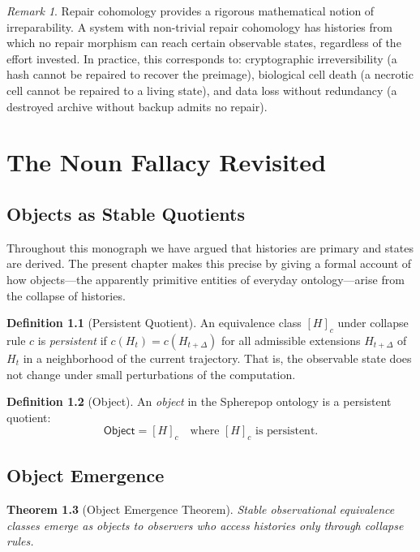 \documentclass[12pt, a4paper, openany]{book}
\theoremstyle{plain}
\newtheorem{theorem}{Theorem}[chapter]
\theoremstyle{definition}
\newtheorem{definition}[theorem]{Definition}
\theoremstyle{remark}
\newtheorem{remark}[theorem]{Remark}
\begin{document}
\begin{remark}
Repair cohomology provides a rigorous mathematical notion of irreparability.
A system with non-trivial repair cohomology has histories from which no
repair morphism can reach certain observable states, regardless of the effort
invested. In practice, this corresponds to: cryptographic irreversibility
(a hash cannot be repaired to recover the preimage), biological cell death
(a necrotic cell cannot be repaired to a living state), and data loss without
redundancy (a destroyed archive without backup admits no repair).
\end{remark}

\chapter{The Noun Fallacy Revisited}

\section{Objects as Stable Quotients}

Throughout this monograph we have argued that histories are primary and states
are derived. The present chapter makes this precise by giving a formal account
of how objects---the apparently primitive entities of everyday ontology---arise
from the collapse of histories.

\begin{definition}[Persistent Quotient]
An equivalence class $[H]_c$ under collapse rule $c$ is \emph{persistent} if
$c(H_t) = c(H_{t+\Delta})$ for all admissible extensions $H_{t+\Delta}$ of $H_t$
in a neighborhood of the current trajectory. That is, the observable state does
not change under small perturbations of the computation.
\end{definition}

\begin{definition}[Object]
An \emph{object} in the Spherepop ontology is a persistent quotient:
\[
\mathsf{Object} = [H]_c \quad \text{where } [H]_c \text{ is persistent.}
\]
\end{definition}

\section{Object Emergence}

\begin{theorem}[Object Emergence Theorem]
Stable observational equivalence classes emerge as objects to observers
who access histories only through collapse rules.
\end{theorem}
\end{document}
